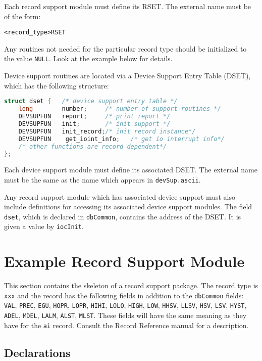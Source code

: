 Each record support module must define its RSET. The external name must be of the form:

\begin{verbatim}
<record_type>RSET
\end{verbatim}

Any routines not needed for the particular record type should be initialized to the value \verb|NULL|.
Look at the example below for details.

Device support routines are located via a Device Support Entry Table (DSET), which has the following structure:

\begin{lstlisting}[language=C]
struct dset {   /* device support entry table */
    long        number;     /* number of support routines */
    DEVSUPFUN   report;     /* print report */
    DEVSUPFUN   init;       /* init support */
    DEVSUPFUN   init_record;/* init record instance*/
    DEVSUPFUN    get_ioint_info;   /* get io interrupt info*/
    /* other functions are record dependent*/
};
\end{lstlisting}

Each device support module must define its associated DSET.
The external name must be the same as the name which appears in \verb|devSup.ascii|.

Any record support module which has associated device support must also include definitions for accessing its associated device support modules.
The field \verb|dset|, which is declared in \verb|dbCommon|, contains the address of the DSET.
It is given a value by \verb|iocInit|.

\section{Example Record Support Module}

This section contains the skeleton of a record support package.
The record type is \verb|xxx| and the record has the following fields in addition to the \verb|dbCommon| fields:
\verb|VAL|, \verb|PREC|, \verb|EGU|, \verb|HOPR|, \verb|LOPR|, \verb|HIHI|, \verb|LOLO|, \verb|HIGH|, \verb|LOW|, \verb|HHSV|, \verb|LLSV|, \verb|HSV|, \verb|LSV|, \verb|HYST|, \verb|ADEL|, \verb|MDEL|, \verb|LALM|, \verb|ALST|, \verb|MLST|.
These fields will have the same meaning as they have for the \verb|ai| record.
Consult the Record Reference manual for a description.

\subsection{Declarations}


